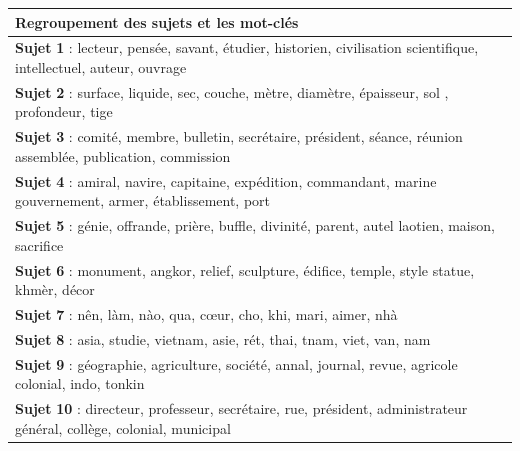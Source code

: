 \begin{tabular}{|p{15cm}|}
\hline
Regroupement des sujets et les mot-clés\\
\hline
\textbf{Sujet} \textbf{1 }:  lecteur,  pensée,  savant,  étudier,  historien,  civilisation  scientifique,  intellectuel,  auteur,  ouvrage \\ \hline
\textbf{Sujet} \textbf{2} :  surface,  liquide,  sec,  couche,  mètre,  diamètre,  épaisseur,  sol , profondeur,  tige\\ \hline
\textbf{Sujet} \textbf{3} : comité,  membre,  bulletin,  secrétaire,  président,  séance,  réunion  assemblée,  publication,  commission \\ \hline
\textbf{Sujet} \textbf{4} :  amiral,  navire,  capitaine,  expédition,  commandant,  marine  gouvernement,  armer,  établissement,  port \\ \hline
\textbf{Sujet} \textbf{5} : génie,  offrande,  prière,  buffle,  divinité,  parent,  autel  laotien,  maison,  sacrifice \\ \hline
\textbf{Sujet} \textbf{6} :  monument,  angkor,  relief,  sculpture,  édifice,  temple,  style  statue,  khmèr,  décor \\ \hline
\textbf{Sujet} \textbf{7} :  nên,  làm,  nào,  qua,  cœur,  cho,  khi,  mari,  aimer,  nhà  \\ \hline
\textbf{Sujet} \textbf{8} :  asia,  studie,  vietnam,  asie,  rét,  thai,  tnam,  viet,  van,  nam \\ \hline
\textbf{Sujet} \textbf{9} :  géographie,  agriculture,  société,  annal,  journal,  revue,  agricole  colonial,  indo,  tonkin \\ \hline
\textbf{Sujet} \textbf{10} :  directeur,  professeur,  secrétaire,  rue,  président,  administrateur  général,  collège,  colonial,  municipal \\ 
\hline
\end{tabular}
\vspace{1cm}

